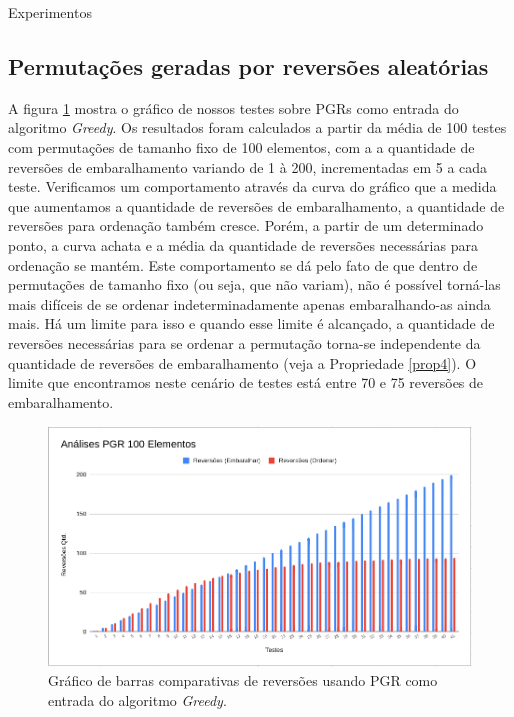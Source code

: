 \begin{chapter}{Experimentos}
\subsection{Permutações geradas por reversões aleatórias}
    
A figura \ref{Grafico6} mostra o gráfico de nossos testes sobre PGRs como entrada do algoritmo \textit{Greedy}. Os resultados foram calculados a partir da média de 100 testes com permutações de tamanho fixo de 100 elementos, com a a quantidade de reversões de embaralhamento variando de 1 à 200, incrementadas em 5 a cada teste. Verificamos um comportamento através da curva do gráfico que a medida que aumentamos a quantidade de reversões de embaralhamento, a quantidade de reversões para ordenação também cresce. Porém, a partir de um determinado ponto, a curva achata e a média da quantidade de reversões necessárias para ordenação se mantém. Este comportamento se dá pelo fato de que dentro de permutações de tamanho fixo (ou seja, que não variam), não é possível torná-las mais difíceis de se ordenar indeterminadamente apenas embaralhando-as ainda mais. Há um limite para isso e quando esse limite é alcançado, a quantidade de reversões necessárias para se ordenar a permutação torna-se independente da quantidade de reversões de embaralhamento (veja a Propriedade \ref{prop4}). O limite que encontramos neste cenário de testes está entre 70 e 75 reversões de embaralhamento. 

\begin{figure}[H]
  \centering
  \begin{minipage}[t]{0.8\textwidth}
    \includegraphics[width=\textwidth]{Imagens/Analises/G_PGR2.png}
    \caption{\label{Grafico6} Gráfico de  barras comparativas de reversões usando PGR como entrada do algoritmo \textit{Greedy}.}
  \end{minipage}
\end{figure}



\end{chapter}
